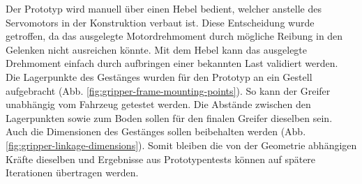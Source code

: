 Der Prototyp wird manuell über einen Hebel bedient, welcher anstelle des Servomotors in der Konstruktion verbaut ist. Diese Entscheidung wurde getroffen, da das ausgelegte Motordrehmoment durch mögliche Reibung in den Gelenken nicht ausreichen könnte. Mit dem Hebel kann das ausgelegte Drehmoment einfach durch aufbringen einer bekannten Last validiert werden.
\\
Die Lagerpunkte des Gestänges wurden für den Prototyp an ein Gestell aufgebracht (Abb. \ref{fig:gripper-frame-mounting-points}). So kann der Greifer unabhängig vom Fahrzeug getestet werden. Die Abstände zwischen den Lagerpunkten sowie zum Boden sollen für den finalen Greifer dieselben sein. Auch die Dimensionen des Gestänges sollen beibehalten werden (Abb. \ref{fig:gripper-linkage-dimensions}). Somit bleiben die von der Geometrie abhängigen Kräfte dieselben und Ergebnisse aus Prototypentests können auf spätere Iterationen übertragen werden. 

